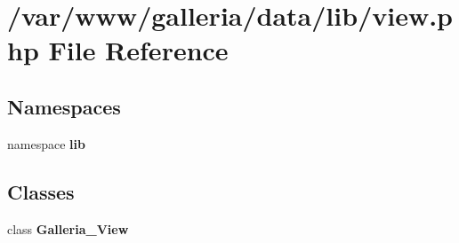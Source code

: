 \section{/var/www/galleria/data/lib/view.php File Reference}
\label{view_8php}
\subsection*{Namespaces}
\begin{CompactItemize}
\item 
namespace {\bf lib}
\end{CompactItemize}
\subsection*{Classes}
\begin{CompactItemize}
\item 
class {\bf Galleria\_\-View}
\end{CompactItemize}
